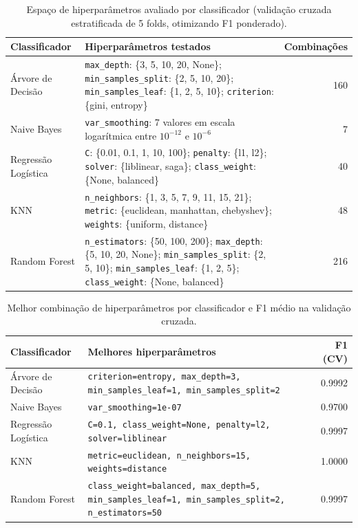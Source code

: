 \documentclass[a4paper,10pt]{article}
\begin{document}
\begin{table}[H]
\centering
\small
\caption{Espaço de hiperparâmetros avaliado por classificador (validação cruzada estratificada de 5 folds, otimizando F1 ponderado).}
\label{tab:grids}
\begin{tabular}{@{}l p{8.8cm} r@{}}
\toprule
Classificador & Hiperparâmetros testados & Combinações \\
\midrule
Árvore de Decisão &
\texttt{max\_depth}: \{3, 5, 10, 20, None\}; \texttt{min\_samples\_split}: \{2, 5, 10, 20\}; \texttt{min\_samples\_leaf}: \{1, 2, 5, 10\}; \texttt{criterion}: \{gini, entropy\} & 160 \\[4pt]
Naive Bayes &
\texttt{var\_smoothing}: 7 valores em escala logarítmica entre $10^{-12}$ e $10^{-6}$ & 7 \\[4pt]
Regressão Logística &
\texttt{C}: \{0.01, 0.1, 1, 10, 100\}; \texttt{penalty}: \{l1, l2\}; \texttt{solver}: \{liblinear, saga\}; \texttt{class\_weight}: \{None, balanced\} & 40 \\[4pt]
KNN &
\texttt{n\_neighbors}: \{1, 3, 5, 7, 9, 11, 15, 21\}; \texttt{metric}: \{euclidean, manhattan, chebyshev\}; \texttt{weights}: \{uniform, distance\} & 48 \\[4pt]
Random Forest &
\texttt{n\_estimators}: \{50, 100, 200\}; \texttt{max\_depth}: \{5, 10, 20, None\}; \texttt{min\_samples\_split}: \{2, 5, 10\}; \texttt{min\_samples\_leaf}: \{1, 2, 5\}; \texttt{class\_weight}: \{None, balanced\} & 216 \\
\bottomrule
\end{tabular}
\end{table}

\begin{table}[H]
\centering
\small
\caption{Melhor combinação de hiperparâmetros por classificador e F1 médio na validação cruzada.}
\label{tab:best-params}
\begin{tabular}{@{}l p{8.8cm} r@{}}
\toprule
Classificador & Melhores hiperparâmetros & F1 (CV) \\
\midrule
Árvore de Decisão & \texttt{criterion=entropy, max\_depth=3, min\_samples\_leaf=1, min\_samples\_split=2} & 0.9992 \\
Naive Bayes & \texttt{var\_smoothing=1e-07} & 0.9700 \\
Regressão Logística & \texttt{C=0.1, class\_weight=None, penalty=l2, solver=liblinear} & 0.9997 \\
KNN & \texttt{metric=euclidean, n\_neighbors=15, weights=distance} & 1.0000 \\
Random Forest & \texttt{class\_weight=balanced, max\_depth=5, min\_samples\_leaf=1, min\_samples\_split=2, n\_estimators=50} & 0.9997 \\
\bottomrule
\end{tabular}
\end{table}
\end{document}
